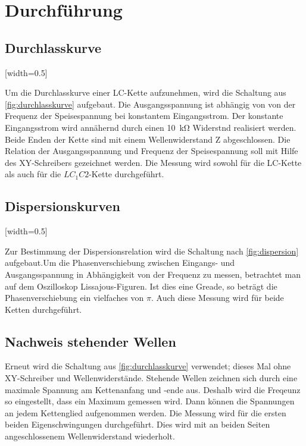 \section{Durchführung}
\label{sec:Durchführung}

\subsection{Durchlasskurve}

[width=0.5\textwidth]

Um die Durchlasskurve einer LC-Kette aufzunehmen, wird die Schaltung aus \ref{fig:durchlasskurve}
aufgebaut. Die Ausgangsspannung ist abhängig von von der Frequenz der Speisespannung bei konstantem Eingangsstrom. Der konstante Eingangsstrom wird annähernd durch einen \SI{10}{\kilo\ohm} Widerstnd realisiert werden. Beide Enden der Kette sind mit einem Wellenwiderstand Z abgeschlossen. Die Relation der Ausgangsspannung und Frequenz der Speisespannung soll mit Hilfe des XY-Schreibers gezeichnet werden.
Die Messung wird sowohl für die LC-Kette als auch für die $LC_{1}C{2}$-Kette durchgeführt.

\subsection{Dispersionskurven}

[width=0.5\textwidth]

Zur Bestimmung der Dispersionsrelation wird die Schaltung nach \ref{fig:dispersion} aufgebaut.Um die Phasenverschiebung zwischen Eingangs- und Ausgangsspannung in Abhängigkeit von der Frequenz zu messen, betrachtet man auf dem Oszilloskop Lissajous-Figuren. Ist dies eine Greade, so beträgt die Phasenverschiebung ein vielfaches von $\pi$. Auch diese Messung wird für beide Ketten durchgeführt.

\subsection{Nachweis stehender Wellen}
Erneut wird die Schaltung aus \ref{fig:durchlasskurve} verwendet; dieses Mal ohne XY-Schreiber und Wellenwiderstände. Stehende Wellen zeichnen sich durch eine maximale Spannung am Kettenanfang und -ende aus. Deshalb wird die Freqeunz so eingestellt, dass ein Maximum gemessen wird. Dann können die Spannungen an jedem Kettenglied aufgenommen werden. Die Messung wird für die ersten beiden Eigenschwingungen durchgeführt.
Dies wird mit an beiden Seiten angeschlossenem Wellenwiderstand wiederholt.

